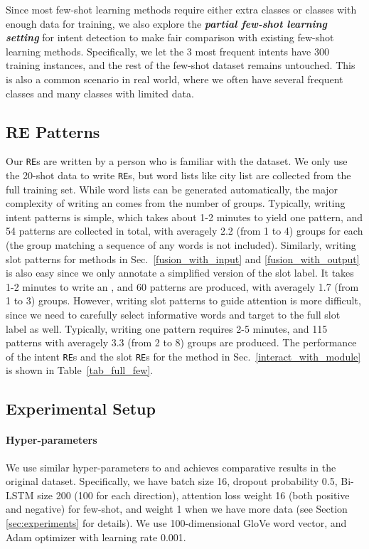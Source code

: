 Since most few-shot learning methods require either extra classes or classes with enough data for training, we also explore the \textbf{\emph{partial few-shot learning setting}} for intent detection to make fair comparison with existing few-shot learning methods. Specifically, we let the 3 most frequent intents have 300 training instances, and the rest of the few-shot dataset remains untouched.
This is also a common scenario in real world, where we often have several frequent classes and many classes with limited data.

\subsection{RE Patterns}
\label{re_in_exp} Our \texttt{RE}s are written by a person who is familiar with the dataset. We only use the 20-shot data to write
\texttt{RE}s, but word lists like city list are collected from the full training set. While word lists can be generated automatically, the
major complexity of writing an \RE comes from the number of \RE groups. Typically, writing intent patterns is simple, which takes about 1-2
minutes to yield one pattern, and 54 patterns are collected in total, with averagely 2.2 (from 1 to 4) \RE groups for each \RE (the group
matching a sequence of any words is not included). Similarly, writing slot patterns for methods in Sec.~\ref{fusion_with_input} and
\ref{fusion_with_output} is also easy since we only annotate a simplified version of the slot label. It takes 1-2 minutes to write an \RE,
and 60 patterns are produced, with averagely 1.7 (from 1 to 3) \RE groups. However, writing slot patterns to guide attention is more
difficult, since we need to carefully select informative words and target to the full slot label as well. Typically, writing one pattern
requires 2-5 minutes, and 115 patterns with averagely 3.3 (from 2 to 8) \RE groups are produced. The performance of the intent \texttt{RE}s
and the slot \texttt{RE}s for the method in Sec.~\ref{interact_with_module} is shown in Table~\ref{tab_full_few}. 


\subsection{Experimental Setup}
\paragraph{Hyper-parameters}
We use similar hyper-parameters to \cite{liu2016attention} and achieves comparative results in the original dataset. Specifically, we have batch size 16, dropout probability 0.5, Bi-LSTM size 200 (100 for each direction), attention loss weight 16 (both positive and negative) for few-shot, and weight 1 when we have more data (see Section \ref{sec:experiments} for details). We use 100-dimensional GloVe \cite{pennington2014glove} word vector, and Adam optimizer \cite{kingma2014adam} with learning rate 0.001.

